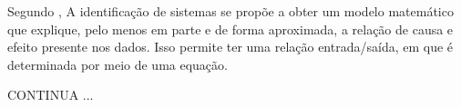 Segundo \cite{aguirre2004intro}, A identificação de sistemas se propõe a obter um modelo matemático que explique, pelo menos em parte e de forma aproximada, a relação de causa e efeito presente nos dados. Isso permite ter uma relação entrada/saída, em que é determinada por meio de uma equação.

CONTINUA ...